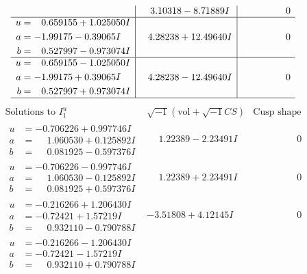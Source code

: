 \documentclass[1p]{elsarticle_modified}
\theoremstyle{definition}
\newcommand{\I}{\sqrt{-1}}
\begin{document}
$$\begin{array}{c|c|c}
 & \phantom{-}3.10318 - 8.71889 I & \phantom{-0.000000 } 0 \\ \hline\begin{aligned}
u &= \phantom{-}0.659155 + 1.025050 I \\
a &= -1.99175 - 0.39065 I \\
b &= \phantom{-}0.527997 - 0.973074 I\end{aligned}
 & \phantom{-}4.28238 + 12.49640 I & \phantom{-0.000000 } 0 \\ \hline\begin{aligned}
u &= \phantom{-}0.659155 - 1.025050 I \\
a &= -1.99175 + 0.39065 I \\
b &= \phantom{-}0.527997 + 0.973074 I\end{aligned}
 & \phantom{-}4.28238 - 12.49640 I & \phantom{-0.000000 } 0\\
 \hline 
 \end{array}$$\newpage$$\begin{array}{c|c|c}  
\text{Solutions to }I^u_{1}& \I (\text{vol} + \sqrt{-1}CS) & \text{Cusp shape}\\
 \hline 
\begin{aligned}
u &= -0.706226 + 0.997746 I \\
a &= \phantom{-}1.060530 + 0.125892 I \\
b &= \phantom{-}0.081925 - 0.597376 I\end{aligned}
 & \phantom{-}1.22389 - 2.23491 I & \phantom{-0.000000 } 0 \\ \hline\begin{aligned}
u &= -0.706226 - 0.997746 I \\
a &= \phantom{-}1.060530 - 0.125892 I \\
b &= \phantom{-}0.081925 + 0.597376 I\end{aligned}
 & \phantom{-}1.22389 + 2.23491 I & \phantom{-0.000000 } 0 \\ \hline\begin{aligned}
u &= -0.216266 + 1.206430 I \\
a &= -0.72421 + 1.57219 I \\
b &= \phantom{-}0.932110 - 0.790788 I\end{aligned}
 & -3.51808 + 4.12145 I & \phantom{-0.000000 } 0 \\ \hline\begin{aligned}
u &= -0.216266 - 1.206430 I \\
a &= -0.72421 - 1.57219 I \\
b &= \phantom{-}0.932110 + 0.790788 I\end{aligned}

\end{array}$$
\end{document}
